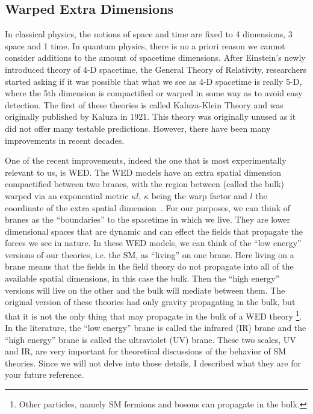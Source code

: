 \subsection{Warped Extra Dimensions}

In classical physics, the notions of space and time are fixed to 4 dimensions, 3 space and 1 time.
In quantum physics, there is no a priori reason we cannot consider additions to the amount of spacetime dimensions.
After Einstein's newly introduced theory of 4-D spacetime, the General Theory of Relativity, researchers started asking if it was possible that what we see as 4-D spacetime is really 5-D, where the 5th dimension is compactified or warped in some way as to avoid easy detection.
The first of these theories is called Kaluza-Klein Theory and was originally published by Kaluza in 1921. This theory was originally unused as it did not offer many testable predictions. However, there have been many improvements in recent decades.

One of the recent improvements, indeed the one that is most experimentally relevant to us, is WED. 
The WED models have an extra spatial dimension compactified between two branes, with the region between (called the bulk) warped via an exponential metric ${\kappa l}$, $\kappa$ being the warp factor and $l$ the coordinate of the extra spatial dimension~\cite{Giudice:2000av}. 
For our purposes, we can think of branes as the ``boundaries'' to the spacetime in which we live. They are lower dimensional spaces that are dynamic and can effect the fields that propagate the forces we see in nature.
In these WED models, we can think of the ``low energy'' versions of our theories, i.e. the SM, as ``living'' on one brane. Here living on a brane means that the fields in the field theory do not propagate into all of the available spatial dimensions, in this case the bulk.
Then the ``high energy'' versions will live on the other and the bulk will mediate between them. The original version of these theories had only gravity propagating in the bulk, but that it is not the only thing that may propagate in the bulk of a WED theory \footnote{Other particles, namely SM fermions and bosons can propagate in the bulk.}.
In the literature, the ``low energy'' brane is called the infrared (IR) brane and the ``high energy'' brane is called the ultraviolet (UV) brane. 
These two scales, UV and IR, are very important for theoretical discussions of the behavior of SM theories. Since we will not delve into those details, I described what they are for your future reference.

